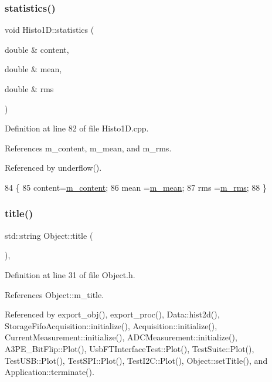 \subsubsection{\texorpdfstring{statistics()}{statistics()}}
{\footnotesize\ttfamily void Histo1\+D\+::statistics (\begin{DoxyParamCaption}\item[{double \&}]{content,  }\item[{double \&}]{mean,  }\item[{double \&}]{rms }\end{DoxyParamCaption})}



Definition at line 82 of file Histo1\+D.\+cpp.



References m\+\_\+content, m\+\_\+mean, and m\+\_\+rms.



Referenced by underflow().


\begin{DoxyCode}
84                                      \{
85   content=\hyperlink{classHisto1D_a75f4abeae577e232f4c012cb6b4049d7}{m\_content};
86   mean   =\hyperlink{classHisto1D_a7e49893543fb5d2af37167690bc0b0ff}{m\_mean};
87   rms    =\hyperlink{classHisto1D_a1331c670df40eb18d8a814f5a15ec7da}{m\_rms};
88 \}
\end{DoxyCode}
\mbox{\label{classObject_a73a0f1a41828fdd8303dd662446fb6c3}} 
\subsubsection{\texorpdfstring{title()}{title()}}
{\footnotesize\ttfamily std\+::string Object\+::title (\begin{DoxyParamCaption}{ }\end{DoxyParamCaption})\hspace{0.3cm}{\ttfamily [inline]}, {\ttfamily [inherited]}}



Definition at line 31 of file Object.\+h.



References Object\+::m\+\_\+title.



Referenced by export\+\_\+obj(), export\+\_\+proc(), Data\+::hist2d(), Storage\+Fifo\+Acquisition\+::initialize(), Acquisition\+::initialize(), Current\+Measurement\+::initialize(), A\+D\+C\+Measurement\+::initialize(), A3\+P\+E\+\_\+\+Bit\+Flip\+::\+Plot(), Usb\+F\+T\+Interface\+Test\+::\+Plot(), Test\+Suite\+::\+Plot(), Test\+U\+S\+B\+::\+Plot(), Test\+S\+P\+I\+::\+Plot(), Test\+I2\+C\+::\+Plot(), Object\+::set\+Title(), and Application\+::terminate().


